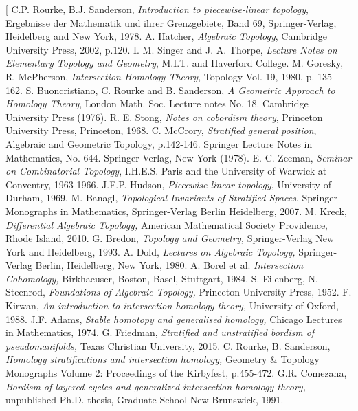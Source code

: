 \documentclass{scrreprt}
\begin{document}
\begin{thebibliography}[
C.P. Rourke, B.J. Sanderson, \textit{Introduction to piecewise-linear topology}, Ergebnisse der Mathematik und ihrer Grenzgebiete, Band 69, Springer-Verlag, Heidelberg and New York, 1978.
A. Hatcher, \textit{Algebraic Topology}, Cambridge University Press, 2002, p.120.
I. M. Singer and J. A. Thorpe, \textit{Lecture Notes on Elementary Topology and Geometry}, M.I.T. and Haverford College.
M. Goresky, R. McPherson, \textit{Intersection Homology Theory}, Topology Vol. 19, 1980, p. 135-162.
S. Buoncristiano, C. Rourke and B. Sanderson, \textit{A Geometric Approach to Homology Theory}, London Math. Soc. Lecture notes No. 18. Cambridge University Press (1976).
R. E. Stong, \textit{Notes on cobordism theory}, Princeton University Press, Princeton, 1968.
C. McCrory, \textit{Stratified general position}, Algebraic and Geometric Topology, p.142-146. Springer Lecture Notes in Mathematics, No. 644. Springer-Verlag, New York (1978).
E. C. Zeeman, \textit{Seminar on Combinatorial Topology}, I.H.E.S. Paris and the University of Warwick at Conventry, 1963-1966.
J.F.P. Hudson, \textit{Piecewise linear topology}, University of Durham, 1969.
M. Banagl, \textit{Topological Invariants of Stratified Spaces}, Springer Monographs in Mathematics, Springer-Verlag Berlin Heidelberg, 2007.
M. Kreck, \textit{Differential Algebraic Topology,} American Mathematical Society Providence, Rhode Island, 2010.
G. Bredon, \textit{Topology and Geometry,} Springer-Verlag New York and Heidelberg, 1993.
A. Dold, \textit{Lectures on Algebraic Topology,} Springer-Verlag Berlin, Heidelberg, New York, 1980.
A. Borel et al. \textit{Intersection Cohomology,} Birkhaeuser, Boston, Basel, Stuttgart, 1984.
S. Eilenberg, N. Steenrod, \textit{Foundations of Algebraic Topology,} Princeton University Press, 1952.
F. Kirwan, \textit{An introduction to intersection homology theory,} University of Oxford, 1988.
J.F. Adams, \textit{Stable homotopy and generalised homology,} Chicago Lectures in Mathematics, 1974.
G. Friedman, \textit{Stratified and unstratified bordism of pseudomanifolds,} 	Texas Christian University, 2015.
C. Rourke, B. Sanderson, \textit{Homology stratifications and intersection homology,} Geometry \& Topology Monographs Volume 2: Proceedings of the Kirbyfest, p.455-472.
G.R. Comezana, \textit{Bordism of layered cycles and generalized intersection homology theory,} unpublished Ph.D. thesis, Graduate School-New Brunswick, 1991.
\end{thebibliography}
\end{document}
